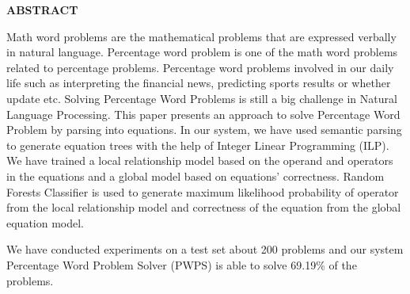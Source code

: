 \documentclass[document.tex]{subfiles}
\begin{document}
	\begin{center}
		\textbf{{\fontsize{16pt}{18}\selectfont ABSTRACT}}
		\vspace{1cm}
	\end{center}
	
	\noindent Math word problems are the mathematical problems that are expressed verbally in natural language. Percentage word problem is one of the math word problems related to percentage problems. Percentage word problems involved in our daily life such as interpreting the financial news, predicting sports results or whether update etc. Solving Percentage Word Problems is still a big challenge in Natural Language Processing. This paper	presents an approach to solve Percentage Word Problem by parsing into equations. In our system, we have used semantic parsing to generate equation trees with the help of Integer Linear Programming (ILP). We have trained a local relationship model based on the operand and operators in the equations and a global model based on equations’ correctness. Random Forests Classifier is used to generate maximum likelihood probability of operator from the local relationship model and correctness of the equation from the global equation model.
	
	\noindent We have conducted experiments on a test set about 200 problems and our system Percentage Word Problem Solver (PWPS) is able to solve 69.19\% of the problems.
	
	\clearpage
	
\end{document}
